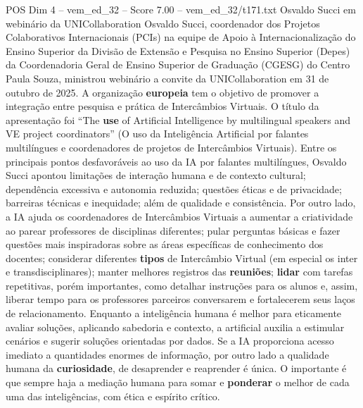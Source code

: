 \begin{textsample}{POS Dim 4 – vem\_ed\_32 – Score 7.00 – vem\_ed\_32/t171.txt}  \label{ex:f4_pos_030}
Osvaldo Succi em webinário da UNICollaboration Osvaldo Succi, coordenador dos Projetos Colaborativos Internacionais (PCIs) na equipe de Apoio à Internacionalização do Ensino Superior da Divisão de Extensão e Pesquisa no Ensino Superior (Depes) da Coordenadoria Geral de Ensino Superior de Graduação (CGESG) do Centro Paula Souza, ministrou webinário a convite da UNICollaboration em 31 de outubro de 2025.
A organização \textbf{europeia} tem o objetivo de promover a integração entre pesquisa e prática de Intercâmbios Virtuais.
O título da apresentação foi “The \textbf{use} of Artificial Intelligence by multilingual speakers and VE project coordinators” (O uso da Inteligência Artificial por falantes multilíngues e coordenadores de projetos de Intercâmbios Virtuais).
Entre os principais pontos desfavoráveis ao uso da IA por falantes multilíngues, Osvaldo Succi apontou limitações de interação humana e de contexto cultural; dependência excessiva e autonomia reduzida; questões éticas e de privacidade; barreiras técnicas e inequidade; além de qualidade e consistência.
Por outro lado, a IA ajuda os coordenadores de Intercâmbios Virtuais a aumentar a criatividade ao parear professores de disciplinas diferentes; pular perguntas básicas e fazer questões mais inspiradoras sobre as áreas específicas de conhecimento dos docentes; considerar diferentes \textbf{tipos} de Intercâmbio Virtual (em especial os inter e transdisciplinares); manter melhores registros das \textbf{reuniões}; \textbf{lidar} com tarefas repetitivas, porém importantes, como detalhar instruções para os alunos e, assim, liberar tempo para os professores parceiros conversarem e fortalecerem seus laços de relacionamento.
Enquanto a inteligência humana é melhor para eticamente avaliar soluções, aplicando sabedoria e contexto, a artificial auxilia a estimular cenários e sugerir soluções orientadas por dados.
Se a IA proporciona acesso imediato a quantidades enormes de informação, por outro lado a qualidade humana da \textbf{curiosidade}, de desaprender e reaprender é única.
O importante é que sempre haja a mediação humana para somar e \textbf{ponderar} o melhor de cada uma das inteligências, com ética e espírito crítico.

\end{textsample}
